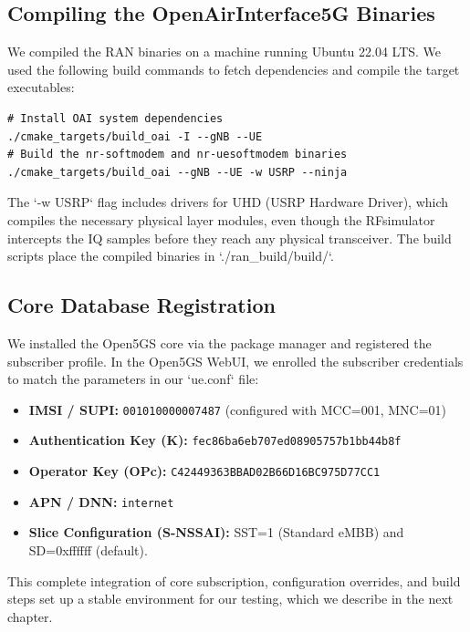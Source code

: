 \subsection{Compiling the OpenAirInterface5G Binaries}
We compiled the RAN binaries on a machine running Ubuntu 22.04 LTS. We used the following build commands to fetch dependencies and compile the target executables:
\begin{verbatim}
# Install OAI system dependencies
./cmake_targets/build_oai -I --gNB --UE
# Build the nr-softmodem and nr-uesoftmodem binaries
./cmake_targets/build_oai --gNB --UE -w USRP --ninja
\end{verbatim}
The `-w USRP` flag includes drivers for UHD (USRP Hardware Driver), which compiles the necessary physical layer modules, even though the RFsimulator intercepts the IQ samples before they reach any physical transceiver. The build scripts place the compiled binaries in `./ran_build/build/`.

\subsection{Core Database Registration}
We installed the Open5GS core via the package manager and registered the subscriber profile. In the Open5GS WebUI, we enrolled the subscriber credentials to match the parameters in our `ue.conf` file:
\begin{itemize}[leftmargin=*]
    \item \textbf{IMSI / SUPI:} \texttt{001010000007487} (configured with MCC=001, MNC=01)
    \item \textbf{Authentication Key (K):} \texttt{fec86ba6eb707ed08905757b1bb44b8f}
    \item \textbf{Operator Key (OPc):} \texttt{C42449363BBAD02B66D16BC975D77CC1}
    \item \textbf{APN / DNN:} \texttt{internet}
    \item \textbf{Slice Configuration (S-NSSAI):} SST=1 (Standard eMBB) and SD=0xffffff (default).
\end{itemize}
This complete integration of core subscription, configuration overrides, and build steps set up a stable environment for our testing, which we describe in the next chapter.